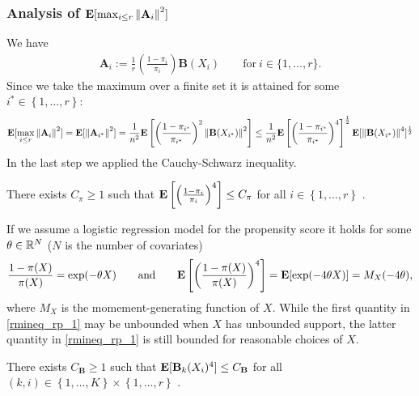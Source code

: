 \subsubsection*{
  Analysis of 
  $
  \mathbf{E}[\max_{i \le r}\left\lVert\mathbf{A}_i\right\rVert^2]
  $
}
We have
\begin{gather}
  \mathbf{A}_i
  :=
  \frac{1}{r}
  \left( 
    \frac{1-\pi_i}{\pi_i}
  \right)
  \mathbf{B}(X_i)
  \qquad
  \text{for}
  \ 
  i\in \{1, \ldots, r\}.
\end{gather}
Since we take the maximum over a finite set it is attained for some 
$i^*\in \left\{ 1, \ldots, r \right\}$:
\begin{align}
  \mathbf{E}[\max_{i \le r}\left\lVert\mathbf{A}_i\right\rVert^2]
  =
  \mathbf{E}[\left\lVert\mathbf{A}_{i^*}\right\rVert^2]
  =
  \frac{1}{n^2}
  \mathbf{E} \left[ 
    \left(
      \frac{1-\pi_{i^*}}{\pi_{i^*}}
    \right)^2
    \left\lVert\mathbf{B}(X_{i^*})\right\rVert^2
  \right]
  \le
  \frac{1}{n^2}
  \mathbf{E} \left[ 
    \left(
      \frac{1-\pi_{i^*}}{\pi_{i^*}}
    \right)^4
  \right]^\frac{1}{2}
  \mathbf{E}[
    \left\lVert\mathbf{B}(X_{i^*})\right\rVert^4
  ]^\frac{1}{2}
\end{align}
In the last step we applied the Cauchy-Schwarz inequality.
\begin{assumption}
  There exists $C_\pi \ge 1$ such that
  $
    \mathbf{E}
    \left[ 
    \left(
      \frac{1-\pi_{i}}{\pi_{i}}
    \right)^4
    \right]
    \le C_\pi
  $
  for all $i\in \left\{ 1, \ldots, r \right\}$
  .
\end{assumption}
 
\begin{remark}
  If we assume a logistic regression model for the propensity score
  it holds for some $\theta \in \mathbb{R}^N$ ($N$ is the number of covariates)
  \begin{gather}
    \label{rmineq_rp_1}
    \frac{1-\pi(X)}{\pi(X)}
    =
    \exp(-\theta X)
    \qquad
    \text{and}
    \qquad
    \mathbf{E}
    \left[ 
    \left(
    \frac{1-\pi(X)}{\pi(X)}
    \right)^4
    \right]
    =
    \mathbf{E}
    [
    \exp(-4\theta X)
    ]
    =
    M_X(-4\theta)
    ,
  \end{gather}
  where $M_X$ is the momement-generating function of $X$.
   While the first quantity in \eqref{rmineq_rp_1}
   may be unbounded when $X$ has unbounded support, the latter quantity in \eqref{rmineq_rp_1} is still bounded for reasonable choices of $X$.
\end{remark}
\begin{assumption}
  There exists $C_\mathbf{B} \ge 1$ such that
  $
  \mathbf{E}[
    \mathbf{B}_k(X_i)^4
  ]
  \le C_\mathbf{B}
  $
  for all $(k,i)\in \left\{ 1, \ldots, K \right\}\times \left\{ 1, \ldots, r \right\}$
  .
\end{assumption}
